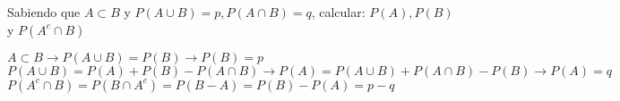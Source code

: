 \item Sabiendo que $A\subset B$ y $P(A\cup B)=p,P(A\cap B)=q$, calcular: $P(A),P(B)$ y $P(A^c\cap B)$
    \begin{center}
        $A\subset B\to P(A\cup B)=P(B)\to P(B)=p$\\
        $P(A\cup B)=P(A)+P(B)-P(A\cap B)\to P(A)=P(A\cup B)+P(A\cap B)-P(B)\to P(A)=q$\\
        $P(A^c\cap B)=P(B\cap A^c)=P(B-A)=P(B)-P(A)=p-q$
    \end{center}